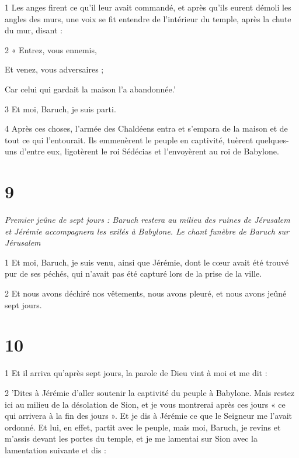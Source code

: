 \par 1 Les anges firent ce qu'il leur avait commandé, et après qu'ils eurent démoli les angles des murs, une voix se fit entendre de l'intérieur du temple, après la chute du mur, disant :

\par 2 « Entrez, vous ennemis,

\par Et venez, vous adversaires ;

\par Car celui qui gardait la maison l'a abandonnée.'

\par 3 Et moi, Baruch, je suis parti.

\par 4 Après ces choses, l'armée des Chaldéens entra et s'empara de la maison et de tout ce qui l'entourait. Ils emmenèrent le peuple en captivité, tuèrent quelques-uns d'entre eux, ligotèrent le roi Sédécias et l'envoyèrent au roi de Babylone.

\chapter{9}

\par \textit{Premier jeûne de sept jours : Baruch restera au milieu des ruines de Jérusalem et Jérémie accompagnera les exilés à Babylone. Le chant funèbre de Baruch sur Jérusalem}

\par 1 Et moi, Baruch, je suis venu, ainsi que Jérémie, dont le cœur avait été trouvé pur de ses péchés, qui n'avait pas été capturé lors de la prise de la ville.

\par 2 Et nous avons déchiré nos vêtements, nous avons pleuré, et nous avons jeûné sept jours.

\chapter{10}

\par 1 Et il arriva qu'après sept jours, la parole de Dieu vint à moi et me dit :

\par 2 'Dites à Jérémie d'aller soutenir la captivité du peuple à Babylone. Mais restez ici au milieu de la désolation de Sion, et je vous montrerai après ces jours « ce qui arrivera à la fin des jours ». Et je dis à Jérémie ce que le Seigneur me l'avait ordonné. Et lui, en effet, partit avec le peuple, mais moi, Baruch, je revins et m'assis devant les portes du temple, et je me lamentai sur Sion avec la lamentation suivante et dis :

